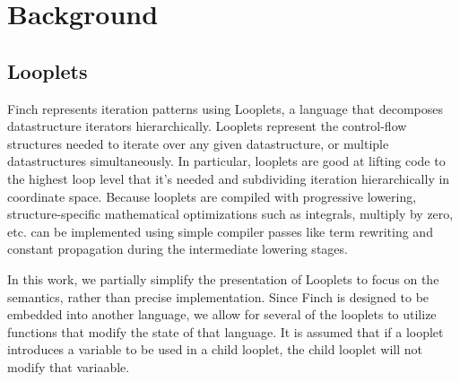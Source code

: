 \section{Background}
\subsection{Looplets}
Finch represents iteration patterns using Looplets, a language that decomposes
datastructure iterators hierarchically. Looplets represent the control-flow
structures needed to iterate over any given datastructure, or multiple
datastructures simultaneously. In particular, looplets are good at lifting code
to the highest loop level that it's needed and subdividing iteration
hierarchically in coordinate space. Because looplets are compiled with
progressive lowering, structure-specific mathematical optimizations such as
integrals, multiply by zero, etc. can be implemented using simple compiler
passes like term rewriting and constant propagation during the intermediate
lowering stages. \cite{ahrens_looplets_2023}

In this work, we partially simplify the presentation of Looplets to focus on the
semantics, rather than precise implementation. Since Finch is designed to be
embedded into another language, we allow for several of the looplets to utilize
functions that modify the state of that language. It is assumed that if a
looplet introduces a variable to be used in a child looplet, the child looplet
will not modify that variaable.

